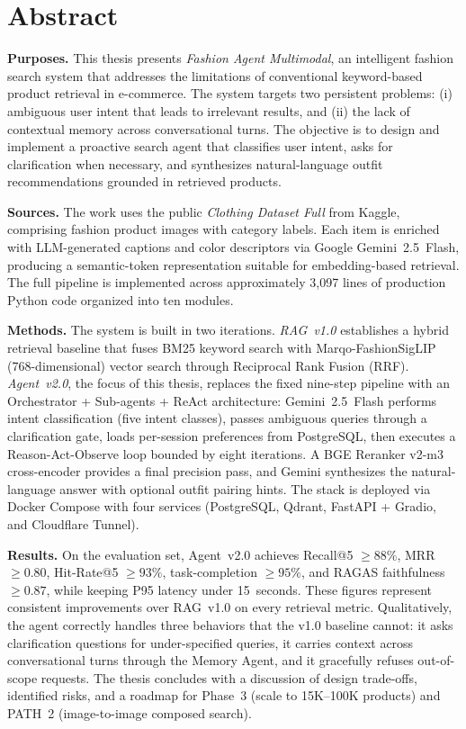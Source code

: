 \documentclass[12pt, twoside]{report}
\newcommand{\addchaptertoc}[1]{\addcontentsline{toc}{chapter}{#1}}
\begin{document}
\chapter*{Abstract}
\addchaptertoc{Abstract}

\noindent
\textbf{Purposes.} This thesis presents \textit{Fashion Agent Multimodal}, an intelligent fashion search system that addresses the limitations of conventional keyword-based product retrieval in e-commerce. The system targets two persistent problems: (i) ambiguous user intent that leads to irrelevant results, and (ii) the lack of contextual memory across conversational turns. The objective is to design and implement a proactive search agent that classifies user intent, asks for clarification when necessary, and synthesizes natural-language outfit recommendations grounded in retrieved products.

\noindent
\textbf{Sources.} The work uses the public \textit{Clothing Dataset Full} from Kaggle, comprising fashion product images with category labels. Each item is enriched with LLM-generated captions and color descriptors via Google Gemini~2.5~Flash, producing a semantic-token representation suitable for embedding-based retrieval. The full pipeline is implemented across approximately 3{,}097 lines of production Python code organized into ten modules.

\noindent
\textbf{Methods.} The system is built in two iterations. \textit{RAG~v1.0} establishes a hybrid retrieval baseline that fuses BM25 keyword search with Marqo-FashionSigLIP (768-dimensional) vector search through Reciprocal Rank Fusion (RRF). \textit{Agent~v2.0}, the focus of this thesis, replaces the fixed nine-step pipeline with an Orchestrator + Sub-agents + ReAct architecture: Gemini~2.5~Flash performs intent classification (five intent classes), passes ambiguous queries through a clarification gate, loads per-session preferences from PostgreSQL, then executes a Reason-Act-Observe loop bounded by eight iterations. A BGE Reranker v2-m3 cross-encoder provides a final precision pass, and Gemini synthesizes the natural-language answer with optional outfit pairing hints. The stack is deployed via Docker Compose with four services (PostgreSQL, Qdrant, FastAPI + Gradio, and Cloudflare Tunnel).

\noindent
\textbf{Results.} On the evaluation set, Agent~v2.0 achieves Recall@5 $\geq 88\%$, MRR $\geq 0.80$, Hit-Rate@5 $\geq 93\%$, task-completion $\geq 95\%$, and RAGAS faithfulness $\geq 0.87$, while keeping P95 latency under 15~seconds. These figures represent consistent improvements over RAG~v1.0 on every retrieval metric. Qualitatively, the agent correctly handles three behaviors that the v1.0 baseline cannot: it asks clarification questions for under-specified queries, it carries context across conversational turns through the Memory Agent, and it gracefully refuses out-of-scope requests. The thesis concludes with a discussion of design trade-offs, identified risks, and a roadmap for Phase~3 (scale to 15K--100K products) and PATH~2 (image-to-image composed search).
\end{document}
